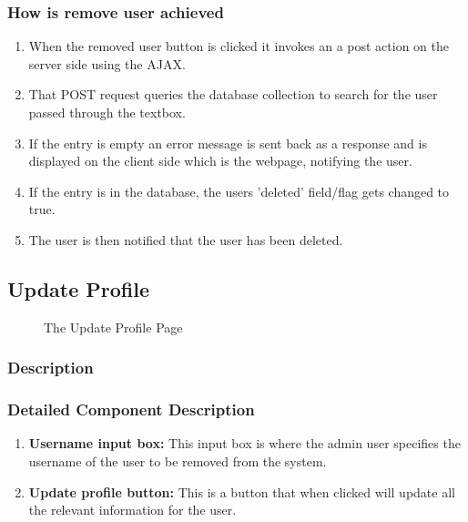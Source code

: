 \documentclass[14pt, a4paper]{article}
\begin{document}
	\subsubsection{How is remove user achieved}
	\begin{enumerate}
			\item When the removed user button is clicked it invokes an a post action on the server side using the AJAX. 
			\item That POST request queries the database collection to search for the user passed through the textbox.
			\item If the entry is empty an error message is sent back as a response and is displayed on the client side which is the webpage, notifying the user. 
			\item  If the entry is in the database, the users 'deleted' field/flag gets changed to true.
			\item  The user is then notified that the user has been deleted.
		\end{enumerate}
		
		
		
\subsection{Update Profile}
	\begin{figure}[H]
		\centerline{}
		\caption{The Update Profile Page}
		\label{fig:updateProf1}
	\end{figure}
	\subsubsection{Description} 
	\subsubsection{Detailed Component Description}
		\begin{enumerate}
			\item \textbf{Username input box:} This input box is where the admin user specifies the username of the user to be removed from the system.
			\item \textbf{Update profile button:} This is a button that when clicked will update all the relevant information for the user.
		\end{enumerate}
\end{document}
